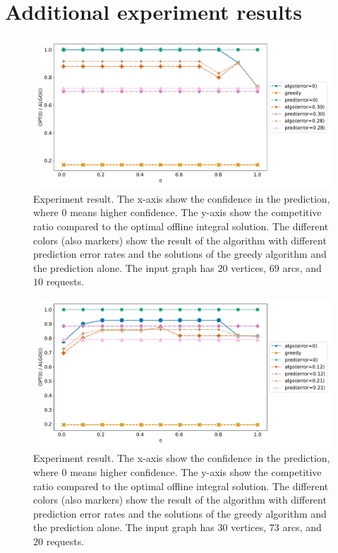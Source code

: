 \section{Additional experiment results} \label{appix:experiments}

\begin{figure}[!ht]
    \includegraphics[width=\linewidth]{Img/figure2.pdf}
    \caption{Experiment result. The x-axis show the confidence in the prediction, where 0 means higher confidence. The y-axis show the competitive ratio compared to the optimal offline integral solution. The different colors (also markers) show the result of the algorithm with different prediction error rates and the solutions of the greedy algorithm and the prediction alone. The input graph has $20$ vertices, $69$ arcs, and $10$ requests.}
    \label{fig:experiment-2}
\end{figure}

\begin{figure}[!ht]
    \includegraphics[width=\linewidth]{Img/figure3.pdf}
    \caption{Experiment result. The x-axis show the confidence in the prediction, where 0 means higher confidence. The y-axis show the competitive ratio compared to the optimal offline integral solution. The different colors (also markers) show the result of the algorithm with different prediction error rates and the solutions of the greedy algorithm and the prediction alone. The input graph has $30$ vertices, $73$ arcs, and $20$ requests.}
    \label{fig:experiment-3}
\end{figure}

